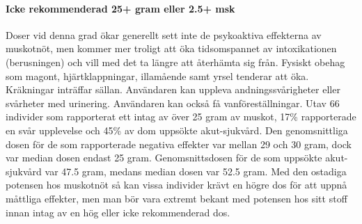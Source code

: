 \paragraph{Icke rekommenderad 25+ gram eller 2.5+ msk}
Doser vid denna grad ökar generellt sett inte de psykoaktiva effekterna av muskotnöt, men kommer mer troligt att öka tidsomspannet av intoxikationen (berusningen) och vill med det ta längre att återhämta sig från.
Fysiskt obehag som magont, hjärtklappningar, illamående samt yrsel tenderar att öka.
Kräkningar inträffar sällan.
Användaren kan uppleva andningssvårigheter eller svårheter med urinering. Användaren kan också få vanföreställningar.
Utav 66 individer som rapporterat ett intag av över 25 gram av muskot, 17\% rapporterade en svår upplevelse och 45\% av dom uppsökte akut-sjukvård.
Den genomsnittliga dosen för de som rapporterade negativa effekter var mellan 29 och 30 gram, dock var median dosen endast 25 gram. Genomsnittsdosen för de som uppsökte akut-sjukvård var 47.5 gram, medans median dosen var 52.5 gram. Med den ostadiga potensen hos muskotnöt så kan vissa individer krävt en högre dos för att uppnå måttliga effekter, men man bör vara extremt bekant med potensen hos sitt stoff innan intag av en hög eller icke rekommenderad dos.









